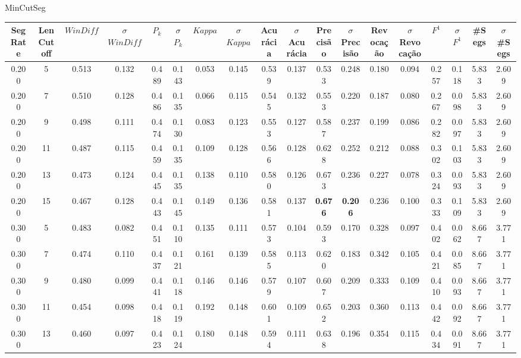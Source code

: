 \newpage
\center MinCutSeg
\tiny\begin{longtable}[c]{|c|c|c|c|c|c|c|c|c|c|c|c|c|c|c|c|c|c|} 
\hline 
 Seg Rate & LenCutoff & $WinDiff$ & $\sigma$$WinDiff$ & $P_k$ & $\sigma$$P_k$ & $Kappa$ & $\sigma$$Kappa$ & Acurácia & $\sigma$Acurácia & Precisão & $\sigma$Precisão & Revocação & $\sigma$Revocação & $F^1$ & $\sigma$$F^1$ & \#Segs & $\sigma$\#Segs\\ \hline 
 0.200 & 5 & 0.513 & 0.132 & 0.489 & 0.143 & 0.053 & 0.145 & 0.539 & 0.137 & 0.533 & 0.248 & 0.180 & 0.094 & 0.257 & 0.118 & 5.833 & 2.609  \\ \hline 
  0.200 & 7 & 0.510 & 0.128 & 0.486 & 0.135 & 0.066 & 0.115 & 0.545 & 0.132 & 0.553 & 0.220 & 0.187 & 0.080 & 0.267 & 0.098 & 5.833 & 2.609  \\ \hline 
  0.200 & 9 & 0.498 & 0.111 & 0.474 & 0.130 & 0.083 & 0.123 & 0.553 & 0.127 & 0.587 & 0.237 & 0.199 & 0.086 & 0.282 & 0.097 & 5.833 & 2.609  \\ \hline 
  0.200 & 11 & 0.487 & 0.115 & 0.459 & 0.135 & 0.109 & 0.128 & 0.566 & 0.128 & 0.628 & 0.252 & 0.212 & 0.088 & 0.302 & 0.103 & 5.833 & 2.609  \\ \hline 
  0.200 & 13 & 0.473 & 0.124 & 0.445 & 0.135 & 0.138 & 0.110 & 0.580 & 0.126 & 0.673 & 0.236 & 0.227 & 0.078 & 0.324 & 0.093 & 5.833 & 2.609  \\ \hline 
  0.200 & 15 & 0.467 & 0.128 & 0.443 & 0.145 & 0.149 & 0.136 & 0.581 & 0.137 & \cellcolor{gray!20} \textbf{0.676} & \cellcolor{gray!20} \textbf{0.206} & 0.236 & 0.100 & 0.333 & 0.109 & 5.833 & 2.609  \\ \hline 
  0.300 & 5 & 0.483 & 0.082 & 0.451 & 0.110 & 0.135 & 0.111 & 0.573 & 0.104 & 0.593 & 0.170 & 0.328 & 0.097 & 0.402 & 0.062 & 8.667 & 3.771  \\ \hline 
  0.300 & 7 & 0.474 & 0.110 & 0.437 & 0.121 & 0.161 & 0.139 & 0.585 & 0.113 & 0.620 & 0.183 & 0.342 & 0.105 & 0.421 & 0.085 & 8.667 & 3.771  \\ \hline 
  0.300 & 9 & 0.480 & 0.099 & 0.441 & 0.118 & 0.146 & 0.146 & 0.579 & 0.107 & 0.607 & 0.209 & 0.333 & 0.109 & 0.410 & 0.093 & 8.667 & 3.771  \\ \hline 
  0.300 & 11 & 0.454 & 0.098 & 0.418 & 0.119 & 0.192 & 0.148 & 0.601 & 0.109 & 0.652 & 0.203 & 0.360 & 0.113 & 0.442 & 0.092 & 8.667 & 3.771  \\ \hline 
  0.300 & 13 & 0.460 & 0.097 & 0.423 & 0.124 & 0.180 & 0.148 & 0.594 & 0.111 & 0.638 & 0.196 & 0.354 & 0.115 & 0.434 & 0.091 & 8.667 & 3.771  \\ \hline 

\end{longtable}
